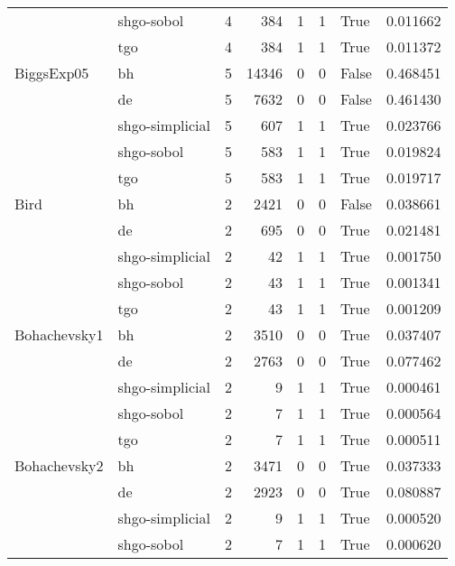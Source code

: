 \begin{longtable}{llrrrrlr}
         & shgo-sobol &     4 &      384 &      1 &       1 &    True &    0.011662 \\
         & tgo &     4 &      384 &      1 &       1 &    True &    0.011372 \\
BiggsExp05 & bh &     5 &    14346 &      0 &       0 &   False &    0.468451 \\
         & de &     5 &     7632 &      0 &       0 &   False &    0.461430 \\
         & shgo-simplicial &     5 &      607 &      1 &       1 &    True &    0.023766 \\
         & shgo-sobol &     5 &      583 &      1 &       1 &    True &    0.019824 \\
         & tgo &     5 &      583 &      1 &       1 &    True &    0.019717 \\
Bird & bh &     2 &     2421 &      0 &       0 &   False &    0.038661 \\
         & de &     2 &      695 &      0 &       0 &    True &    0.021481 \\
         & shgo-simplicial &     2 &       42 &      1 &       1 &    True &    0.001750 \\
         & shgo-sobol &     2 &       43 &      1 &       1 &    True &    0.001341 \\
         & tgo &     2 &       43 &      1 &       1 &    True &    0.001209 \\
Bohachevsky1 & bh &     2 &     3510 &      0 &       0 &    True &    0.037407 \\
         & de &     2 &     2763 &      0 &       0 &    True &    0.077462 \\
         & shgo-simplicial &     2 &        9 &      1 &       1 &    True &    0.000461 \\
         & shgo-sobol &     2 &        7 &      1 &       1 &    True &    0.000564 \\
         & tgo &     2 &        7 &      1 &       1 &    True &    0.000511 \\
Bohachevsky2 & bh &     2 &     3471 &      0 &       0 &    True &    0.037333 \\
         & de &     2 &     2923 &      0 &       0 &    True &    0.080887 \\
         & shgo-simplicial &     2 &        9 &      1 &       1 &    True &    0.000520 \\
         & shgo-sobol &     2 &        7 &      1 &       1 &    True &    0.000620 \\

\end{longtable}
